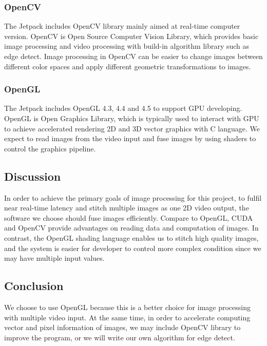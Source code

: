 \documentclass[letterpaper,10pt,serif,draftclsnofoot,onecolumn,compsoc,titlepage]{IEEEtran}
\begin{document}
\subsubsection{OpenCV}
The Jetpack includes OpenCV library mainly aimed at real-time computer version. OpenCV is 
Open Source Computer Vision Library, which provides basic image processing and video 
processing with build-in algorithm library such as edge detect. Image processing in OpenCV 
can be easier to change images between different color spaces and apply different geometric 
transformations to images.\\

\subsubsection{OpenGL}
The Jetpack includes OpenGL 4.3, 4.4 and 4.5 to support GPU developing. OpenGL is Open 
Graphics Library, which is typically used to interact with GPU to achieve accelerated 
rendering 2D and 3D vector graphics with C language. We expect to read images from the video 
input and fuse images by using shaders to control the graphics pipeline.\\ 

\subsection{Discussion}
In order to achieve the primary goals of image processing for this project, to fulfil near 
real-time latency and stitch multiple images as one 2D video output, the software we choose 
should fuse images efficiently. Compare to OpenGL, CUDA and OpenCV provide advantages on 
reading data and computation of images. In contrast, the OpenGL shading language enables us 
to stitch high quality images, and the system is easier for developer to control more complex 
condition since we may have multiple input values. \\


\subsection{Conclusion}
We choose to use OpenGL because this is a better choice for image processing with multiple 
video input. At the same time, in order to accelerate computing vector and pixel information 
of images, we may include OpenCV library to improve the program, or we will write our own 
algorithm for edge detect. \\
\end{document}

